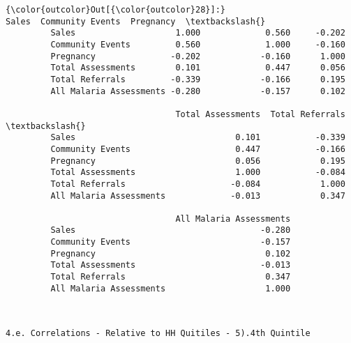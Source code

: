 \documentclass[11pt]{article}
\begin{document}
\begin{Verbatim}[commandchars=\\\{\}]
{\color{outcolor}Out[{\color{outcolor}28}]:}                          Sales  Community Events  Pregnancy  \textbackslash{}
         Sales                    1.000             0.560     -0.202   
         Community Events         0.560             1.000     -0.160   
         Pregnancy               -0.202            -0.160      1.000   
         Total Assessments        0.101             0.447      0.056   
         Total Referrals         -0.339            -0.166      0.195   
         All Malaria Assessments -0.280            -0.157      0.102   
         
                                  Total Assessments  Total Referrals  \textbackslash{}
         Sales                                0.101           -0.339   
         Community Events                     0.447           -0.166   
         Pregnancy                            0.056            0.195   
         Total Assessments                    1.000           -0.084   
         Total Referrals                     -0.084            1.000   
         All Malaria Assessments             -0.013            0.347   
         
                                  All Malaria Assessments  
         Sales                                     -0.280  
         Community Events                          -0.157  
         Pregnancy                                  0.102  
         Total Assessments                         -0.013  
         Total Referrals                            0.347  
         All Malaria Assessments                    1.000  
\end{Verbatim}
            
    \begin{Verbatim}[commandchars=\\\{\}]


4.e. Correlations - Relative to HH Quitiles - 5).4th Quintile

    \end{Verbatim}
\end{document}
